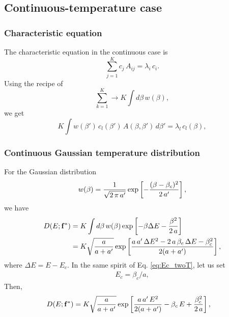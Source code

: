 \documentclass[aip,jcp,preprint,notitlepage, superscriptaddress]{revtex4-1}
\begin{document}
\subsection{Continuous-temperature case}

\subsubsection{Characteristic equation}


The characteristic equation
in the continuous case is
%
\begin{equation}
\sum_{j = 1}^K
  c_j \, A_{ij}
= \lambda_i \, c_i.
\end{equation}
%
Using the recipe of
\[
\sum_{k = 1}^K
\rightarrow
K \int d\beta \, w(\beta),
\]
we get
\begin{equation}
K \int w(\beta') \, c_l(\beta') \, A(\beta, \beta') \, d\beta'
= \lambda_l \, c_l(\beta),
\tag{B9}
\label{eq:eig_continuous}
\end{equation}



\subsubsection{Continuous Gaussian temperature distribution}



For the Gaussian distribution
\begin{align}
w(\beta)
=
\frac{1}{\sqrt{2 \, \pi \, a'}}
\exp\left[
  -\frac{ (\beta - \beta_c)^2 }{ 2 \, a' }
\right],
\notag
\end{align}
%
we have
%
\begin{align*}
D(E; \mathbf{f}^*)
&=
K \int d\beta \, w(\beta)
\exp\left[
  -\beta \Delta E -\frac{ \beta^2 }{ 2 \, a}
\right]
\\
&=
K \sqrt{\frac{a}{a+a'}}
\exp\left[
\frac{
  a \, a' \, \Delta E^2
  - 2 \, a \, \beta_c \, \Delta E
  - \beta_c^2
}
{
  2 (a + a')
}
\right],
\end{align*}
where $\Delta E = E - E_c$.
%
In the same spirit of Eq. \eqref{eq:Ec_twoT},
let us set
\begin{align}
E_c = \beta_c / a,
\label{eq:Ec_cont}
\end{align}
%
Then,
\begin{align*}
D(E; \mathbf{f}^*)
&=
K \sqrt{\frac{a}{a+a'}}
\exp\left[
\frac{
  a \, a' \, E^2
}
{
  2 (a + a')
}
-\beta_c \, E
+
\frac{\beta_c^2}{2 \, a}
\right],
\end{align*}
\end{document}
